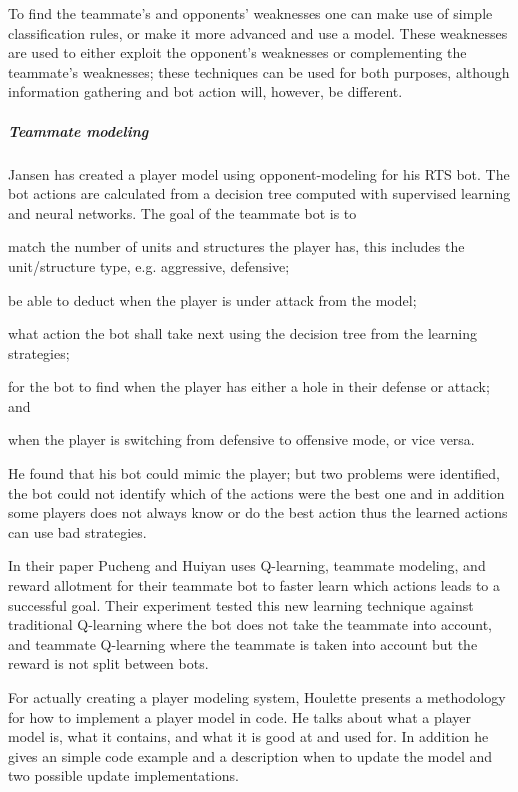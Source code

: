 To find the teammate’s and opponents’ weaknesses one can make use of simple classification rules, or
make it more advanced and use a model. These weaknesses are used to either exploit the opponent's
weaknesses or complementing the teammate's weaknesses; these techniques can be used for both
purposes, although information gathering and bot action will, however, be different.

\subparagraph{Teammate modeling}
Jansen has created a player model using opponent-modeling for his
RTS bot\cite{jansen07}. The bot actions are calculated from a  decision tree computed with
supervised learning and neural networks. The goal of the teammate bot is to
\begin{inparaenum}[1\upshape)]
	\item match the number of units and structures the player has, this includes the unit/structure
	  type, e.g. aggressive, defensive;
	\item be able to deduct when the player is under attack from the model;
	\item what action the bot shall take next using the decision tree from the learning strategies;
	\item for the bot to find when the player has either a hole in their defense or attack; and
	\item when the player is switching from defensive to offensive mode, or vice versa.
\end{inparaenum}
He found that his bot could mimic the player; but two problems were identified, the bot could not
identify which of the actions were the best one and in addition some players does not always know or
do the best action thus the learned actions can use bad strategies.

In their paper\cite{pucheng11} Pucheng and Huiyan uses Q-learning, teammate modeling, and reward
allotment for their teammate bot to faster learn which actions leads to a successful goal. Their
experiment tested this new learning technique against traditional Q-learning where the bot does not
take the teammate into account, and teammate Q-learning where the teammate is taken into account but
the reward is not split between bots.

For actually creating a player modeling system, Houlette presents a methodology for how to implement
a player model in code\cite{houlette03}. He talks about what a player model is, what it contains,
and what it is good at and used for. In addition he gives an simple code example and a description
when to update the model and two possible update implementations.

